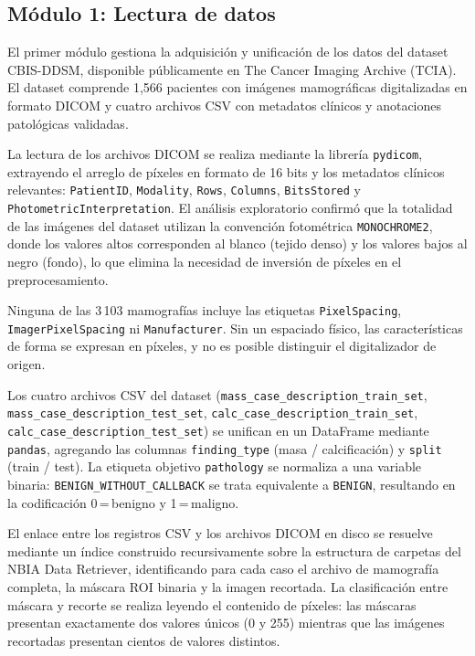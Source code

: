 
\subsection{Módulo 1: Lectura de datos}

El primer módulo gestiona la adquisición y unificación de
los datos del dataset CBIS-DDSM, disponible públicamente
en The Cancer Imaging Archive (TCIA). El dataset comprende 1,566
pacientes con imágenes mamográficas digitalizadas en
formato DICOM y cuatro archivos CSV con metadatos clínicos
y anotaciones patológicas validadas.

La lectura de los archivos DICOM se realiza mediante la
librería \texttt{pydicom}, extrayendo el arreglo de píxeles
en formato de 16 bits y los metadatos clínicos relevantes:
\texttt{PatientID}, \texttt{Modality},
\texttt{Rows}, \texttt{Columns}, \texttt{BitsStored} y
\texttt{PhotometricInterpretation}. El análisis exploratorio
confirmó que la totalidad de las imágenes del dataset
utilizan la convención fotométrica \texttt{MONOCHROME2},
donde los valores altos corresponden al blanco (tejido
denso) y los valores bajos al negro (fondo), lo que
elimina la necesidad de inversión de píxeles en el
preprocesamiento.

Ninguna de las 3\,103 mamografías incluye las etiquetas \texttt{PixelSpacing},
\texttt{ImagerPixelSpacing} ni \texttt{Manufacturer}. Sin un espaciado físico, las características de
forma se expresan en píxeles, y no es posible distinguir el digitalizador de origen.

Los cuatro archivos CSV del dataset
(\texttt{mass\_case\_description\_train\_set},
\texttt{mass\_case\_description\_test\_set},
\texttt{calc\_case\_description\_train\_set},
\texttt{calc\_case\_description\_test\_set})
se unifican en un DataFrame mediante
\texttt{pandas}, agregando las columnas
\texttt{finding\_type} (masa / calcificación) y
\texttt{split} (train / test). La etiqueta objetivo
\texttt{pathology} se normaliza a una variable binaria:
\texttt{BENIGN\_WITHOUT\_CALLBACK} se trata equivalente
a \texttt{BENIGN}, resultando en la codificación
0\,=\,benigno y 1\,=\,maligno.

El enlace entre los registros CSV y los archivos DICOM
en disco se resuelve mediante un índice construido
recursivamente sobre la estructura de carpetas del
NBIA Data Retriever, identificando para cada caso el
archivo de mamografía completa, la máscara ROI binaria
y la imagen recortada. La clasificación entre máscara
y recorte se realiza leyendo el contenido de píxeles:
las máscaras presentan exactamente dos valores únicos
(0 y 255) mientras que las imágenes recortadas presentan
cientos de valores distintos.

